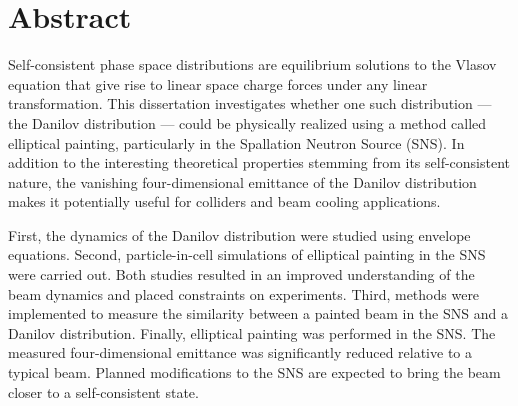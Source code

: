 \chapter*{Abstract} 


Self-consistent phase space distributions are equilibrium solutions to the Vlasov equation that give rise to linear space charge forces under any linear transformation. This dissertation investigates whether one such distribution — the Danilov distribution — could be physically realized using a method called elliptical painting, particularly in the Spallation Neutron Source (SNS). In addition to the interesting theoretical properties stemming from its self-consistent nature, the vanishing four-dimensional emittance of the Danilov distribution makes it potentially useful for colliders and beam cooling applications.

First, the dynamics of the Danilov distribution were studied using envelope equations. Second, particle-in-cell simulations of elliptical painting in the SNS were carried out. Both studies resulted in an improved understanding of the beam dynamics and placed constraints on experiments. Third, methods were implemented to measure the similarity between a painted beam in the SNS and a Danilov distribution. Finally, elliptical painting was performed in the SNS. The measured four-dimensional emittance was significantly reduced relative to a typical beam. Planned modifications to the SNS are expected to bring the beam closer to a self-consistent state.